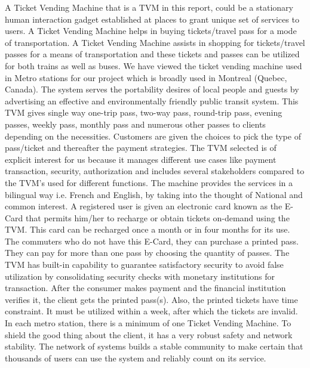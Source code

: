 \documentclass[11pt,oneside]{book}
\begin{document}
A Ticket Vending Machine that is a TVM in this report, could be a stationary human interaction gadget established at places to grant unique set of services to users.  A Ticket Vending Machine helps in buying tickets/travel pass for a mode of transportation. A Ticket Vending Machine assists in shopping for tickets/travel passes for a means of transportation and these tickets and passes can be utilized for both trains as well as buses.\newline\newline
We have viewed the ticket vending machine used in Metro stations for our project which is broadly used in Montreal (Quebec, Canada).  The system serves the portability desires of local people and guests by advertising an effective and environmentally friendly public transit system. This TVM gives single way one-trip pass, two-way pass, round-trip pass, evening passes, weekly pass, monthly pass and numerous other passes to clients depending on the necessities. Customers are given the choices to pick the type of pass/ticket and thereafter the payment strategies. The TVM selected is of explicit interest for us because it manages different use cases like payment transaction, security, authorization and includes several stakeholders compared to the TVM’s used for different functions.\newline\newline
The machine provides the services in a bilingual way i.e. French and English, by taking into the thought of National and common interest. A registered user is given an electronic card known as the E-Card that permits him/her to recharge or obtain tickets on-demand using the TVM. This card can be recharged once a month or in four months for its use. The commuters who do not have this E-Card, they can purchase a printed pass. They can pay for more than one pass by choosing the quantity of passes. The TVM has built-in capability to guarantee satisfactory security to avoid false utilization by consolidating security checks with monetary institutions for transaction. After the consumer makes payment and the financial institution verifies it, the client gets the printed pass(s). Also, the printed tickets have time constraint. It must be utilized within a week, after which the tickets are invalid.\newline\newline
In each metro station, there is a minimum of one Ticket Vending Machine. To shield the good thing about the client, it has a very robust safety and network stability. The network of systems builds a stable community to make certain that thousands of users can use the system and reliably count on its service.
\end{document}
